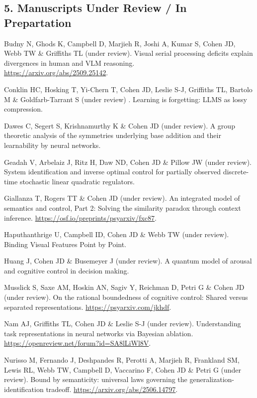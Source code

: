 \documentclass[10 pt]{article}
\begin{document}
\subsection*{5. Manuscripts Under Review / In Prepartation} \label{secPUBLICATIONS5}

Budny N, Ghods K, Campbell D, Marjieh R, Joshi A, Kumar S, Cohen JD, Webb TW \& Griffiths TL (under review). Visual
serial processing deficits explain divergences in human and VLM reasoning. \\ \href{https://arxiv.org/abs/2509.25142}{https://arxiv.org/abs/2509.25142}.

Conklin HC, Hosking T, Yi-Chern T, Cohen JD, Leslie S-J, Griffiths TL, Bartolo M \& Goldfarb-Tarrant S (under review)
. Learning is forgetting: LLMS as lossy compression.

Dawes C, Segert S, Krishnamurthy K \& Cohen JD (under review). A group theoretic analysis of the symmetries underlying base addition and their learnability by neural networks.

Geadah V, Arbelaiz J, Ritz H, Daw ND, Cohen JD \& Pillow JW (under review). System identification and inverse optimal control for partially observed discrete-time stochastic linear quadratic regulators.

Giallanza T, Rogers TT \& Cohen JD (under review). An integrated model of semantics and control, Part 2: Solving the
similarity paradox through context inference. \href{https://osf.io/preprints/psyarxiv/fxc87}{https://osf.io/preprints/psyarxiv/fxc87}.

Haputhanthrige U, Campbell ID, Cohen JD \& Webb TW (under review). Binding Visual Features Point by Point.

Huang J, Cohen JD \& Busemeyer J (under review). A quantum model of arousal and cognitive control in decision making.

Musslick S, Saxe AM, Hoskin AN, Sagiv Y, Reichman D, Petri G \& Cohen JD (under review). On the rational boundedness
of cognitive control: Shared versus separated representations. \href{https://psyarxiv.com/jkhdf}{https://psyarxiv.com/jkhdf}.

Nam AJ, Griffiths TL, Cohen JD \& Leslie S-J (under review). Understanding task representations in neural networks
via Bayesian ablation. \href{https://openreview.net/forum?id=SA8lLiWl8V}{https://openreview.net/forum?id=SA8lLiWl8V}.

Nurisso M, Fernando J, Deshpandes R, Perotti A, Marjieh R, Frankland SM, Lewis RL, Webb TW, Campbell D, Vaccarino F,
Cohen JD \& Petri G (under review). Bound by semanticity: universal laws governing the generalization-identification tradeoff. \href{https://arxiv.org/abs/2506.14797}{https://arxiv.org/abs/2506.14797}.
\end{document}
